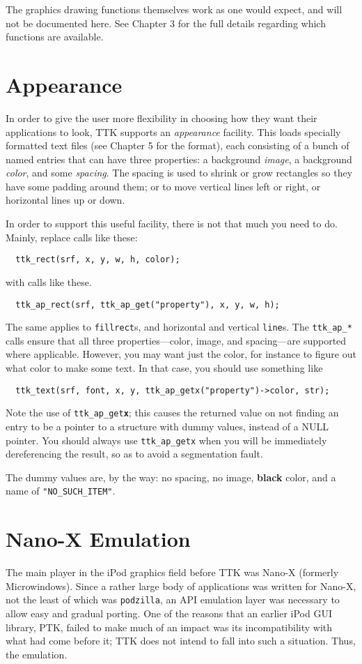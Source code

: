 \documentclass[12pt,letterpaper]{report}
\def\pz{\texttt{podzilla}}
\let\ttt\tt
\def\tt{\def\_{{\ttt\char`\_}}\ttt}
\def\texttt#1{{\tt #1}}
\begin{document}
The graphics drawing functions themselves work as one would expect, and will not be documented here.
See Chapter 3 for the full details regarding which functions are available.

\section{Appearance}
In order to give the user more flexibility in choosing how they want their applications to look,
TTK supports an {\sl appearance} facility. This loads specially formatted text files (see Chapter 5 for
the format), each consisting of a bunch of named entries that can have three properties: a background
{\sl image}, a background {\sl color}, and some {\sl spacing}. The spacing is used to shrink or
grow rectangles so they have some padding around them; or to move vertical lines left or right, or horizontal
lines up or down.

In order to support this useful facility, there is not that much you need to do.
Mainly, replace calls like these:
\begin{verbatim}
  ttk_rect(srf, x, y, w, h, color);
\end{verbatim}
with calls like these.
\begin{verbatim}
  ttk_ap_rect(srf, ttk_ap_get("property"), x, y, w, h);
\end{verbatim}
The same applies
to \verb|fillrect|s, and horizontal and vertical \verb|line|s. The \verb|ttk_ap_*| calls
ensure that all three properties---color, image, and spacing---are supported where applicable.
However, you may want just the color, for instance to figure out what color to make some text.
In that case, you should use something like
\begin{verbatim}
  ttk_text(srf, font, x, y, ttk_ap_getx("property")->color, str);
\end{verbatim}
Note the use of \verb|ttk_ap_get|\texttt{\textbf{x}}; this causes the returned
value on not finding an entry to be a pointer to a structure with dummy values, instead of
a NULL pointer. You should always use \verb|ttk_ap_getx| when you will be immediately
dereferencing the result, so as to avoid a segmentation fault.

The dummy values are, by the way: no spacing, no image, {\bf black} color, and a name of
\verb|"NO_SUCH_ITEM"|.

\section{Nano-X Emulation}
The main player in the iPod graphics field before TTK was Nano-X (formerly Microwindows).
Since a rather large body of applications was written for Nano-X, not the least of which was \pz,
an API emulation layer was necessary to allow easy and gradual porting. One of the reasons
that an earlier iPod GUI library, PTK, failed to make much of an impact was its incompatibility
with what had come before it; TTK does not intend to fall into such a situation. Thus, the emulation.
\end{document}
